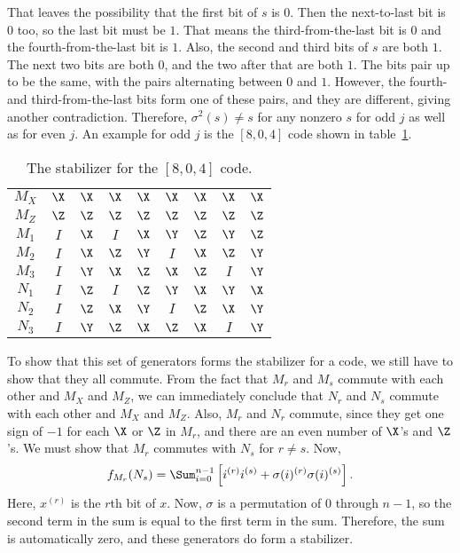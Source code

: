 That leaves the possibility that the first bit of $s$ is $0$.  Then the
next-to-last bit is $0$ too, so the last bit must be $1$.  That means the
third-from-the-last bit is $0$ and the fourth-from-the-last bit is $1$.  Also,
the second and third bits of $s$ are both $1$.  The next two bits are both
$0$, and the two after that are both $1$.  The bits pair up to be the same,
with the pairs alternating between $0$ and $1$.  However, the fourth- and
third-from-the-last bits form one of these pairs, and they are different,
giving another contradiction.  Therefore, $\sigma^2 (s) \neq s$ for any
nonzero $s$ for odd $j$ as well as for even $j$.  An example for odd $j$ is
the $[8, 0, 4]$ code shown in table~\ref{table-8qubit-dist4}.
\begin{table}
	\centering
	\begin{tabular}{c|cccccccc}
		$M_X$ & $\X$ & $\X$ & $\X$ & $\X$ & $\X$ & $\X$ & $\X$ & $\X$ \\
		$M_Z$ & $\Z$ & $\Z$ & $\Z$ & $\Z$ & $\Z$ & $\Z$ & $\Z$ & $\Z$ \\
		$M_1$ & $I$ & $\X$ & $I$ & $\X$ & $\Y$ & $\Z$ & $\Y$ & $\Z$ \\
		$M_2$ & $I$ & $\X$ & $\Z$ & $\Y$ & $I$ & $\X$ & $\Z$ & $\Y$ \\
		$M_3$ & $I$ & $\Y$ & $\X$ & $\Z$ & $\X$ & $\Z$ & $I$ & $\Y$ \\
		$N_1$ & $I$ & $\Z$ & $I$ & $\Z$ & $\Y$ & $\X$ & $\Y$ & $\X$ \\
		$N_2$ & $I$ & $\Z$ & $\X$ & $\Y$ & $I$ & $\Z$ & $\X$ & $\Y$ \\
		$N_3$ & $I$ & $\Y$ & $\Z$ & $\X$ & $\Z$ & $\X$ & $I$ & $\Y$ \\
	\end{tabular}
	\caption{The stabilizer for the $[8, 0, 4]$ code.}
	\label{table-8qubit-dist4}
\end{table}

To show that this set of generators forms the stabilizer for a code, we still
have to show that they all commute.  From the fact that $M_r$ and $M_s$
commute with each other and $M_X$ and $M_Z$, we can immediately
conclude that $N_r$ and $N_s$ commute with each other and $M_X$ and
$M_Z$.  Also, $M_r$ and $N_r$ commute, since they get one sign of $-1$
for each $\X$ or $\Z$ in $M_r$, and there are an even number of $\X$'s and
$\Z$'s.  We must show that $M_r$ commutes with $N_s$ for $r \neq s$.  Now,
\begin{equation}
	f_{M_r} (N_s) = \Sum_{i=0}^{n-1} \left[i^{(r)} i^{(s)} + \sigma(i)^{(r)}
	\sigma(i)^{(s)} \right].
\end{equation}
Here, $x^{(r)}$ is the $r$th bit of $x$.  Now, $\sigma$ is a permutation of
$0$ through $n-1$, so the second term in the sum is equal to the first term
in the sum.  Therefore, the sum is automatically zero, and these generators
do form a stabilizer.

